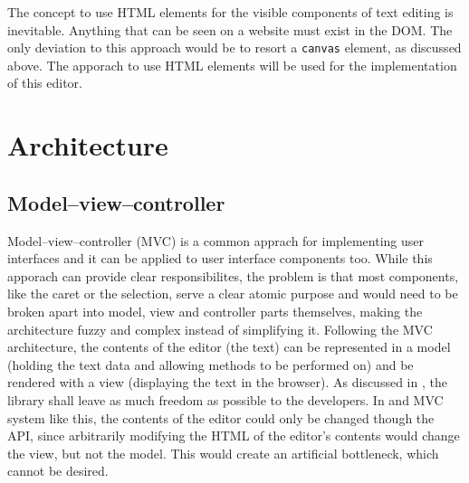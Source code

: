 The concept to use HTML elements for the visible components of text editing is inevitable. Anything that can be seen on a website must exist in the DOM. The only deviation to this approach would be to resort a \texttt{canvas} element, as discussed above. The apporach to use HTML elements will be used for the implementation of this editor.

\chapter{Architecture}
\label{sec:impl_architecture}



\section{Model--view--controller}

Model--view--controller (MVC) is a common apprach for implementing user interfaces and it can be applied to user interface components too. While this apporach can provide clear responsibilites, the problem is that most components, like the caret or the selection, serve a clear atomic purpose and would need to be broken apart into model, view and controller parts themselves, making the architecture fuzzy and complex instead of simplifying it. Following the MVC architecture, the contents of the editor (the text) can be represented in a model (holding the text data and allowing methods to be performed on) and be rendered with a view (displaying the text in the browser). As discussed in , the library shall leave as much freedom as possible to the developers. In and MVC system like this, the contents of the editor could only be changed though the API, since arbitrarily modifying the HTML of the editor's contents would change the view, but not the model. This would create an artificial bottleneck, which cannot be desired.

